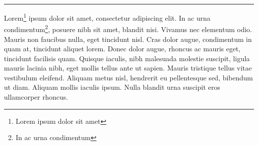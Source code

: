 \documentclass[
]{book}
\begin{document}
\begin{center}\rule{0.5\linewidth}{0.5pt}\end{center}

Lorem\footnote{Lorem ipsum dolor sit amet} ipsum dolor sit amet,
consectetur adipiscing elit. In ac urna condimentum\footnote{In ac urna
  condimentum}, posuere nibh sit amet, blandit nisi. Vivamus nec
elementum odio. Mauris non faucibus nulla, eget tincidunt nisl. Cras
dolor augue, condimentum in quam at, tincidunt aliquet lorem. Donec
dolor augue, rhoncus ac mauris eget, tincidunt facilisis quam. Quisque
iaculis, nibh malesuada molestie suscipit, ligula mauris lacinia nibh,
eget mollis tellus ante ut sapien. Mauris tristique tellus vitae
vestibulum eleifend. Aliquam metus nisl, hendrerit eu pellentesque sed,
bibendum ut diam. Aliquam mollis iaculis ipsum. Nulla blandit urna
suscipit eros ullamcorper rhoncus.

\backmatter
\end{document}
